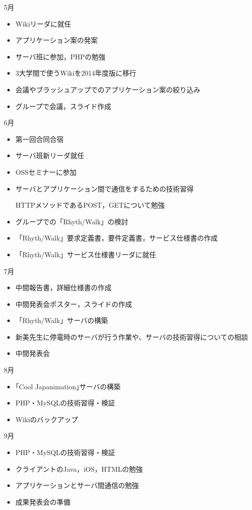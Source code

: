 \par
5月
\begin{itemize}
\item Wikiリーダに就任
\item アプリケーション案の発案
\item サーバ班に参加，PHPの勉強
\item 3大学間で使うWikiを2014年度版に移行
\item 会議やブラッシュアップでのアプリケーション案の絞り込み
\item グループで会議，スライド作成
\end{itemize}
6月
\begin{itemize}
\item 第一回合同合宿
\item サーバ班新リーダ就任
\item OSSセミナーに参加
\item サーバとアプリケーション間で通信をするための技術習得
\par  HTTPメソッドであるPOST，GETについて勉強
\item グループでの「Rhyth/Walk」の検討
\item 「Rhyth/Walk」要求定義書，要件定義書，サービス仕様書の作成
\item 「Rhyth/Walk」サービス仕様書リーダに就任
\end{itemize}
7月
\begin{itemize}
\item 中間報告書，詳細仕様書の作成
\item 中間発表会ポスター，スライドの作成
\item 「Rhyth/Walk」サーバの構築
\item 新美先生に停電時のサーバが行う作業や、サーバの技術習得についての相談
\item 中間発表会
\end{itemize}
8月
\begin{itemize}
\item ｢Cool Japanimation｣サーバの構築
\item PHP・MySQLの技術習得・検証
\item Wikiのバックアップ
\end{itemize}
9月
\begin{itemize}
\item PHP・MySQLの技術習得・検証
\item クライアントのJava，iOS，HTMLの勉強
\item アプリケーションとサーバ間通信の勉強
\item 成果発表会の準備
\end{itemize}

